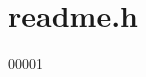 \hypertarget{a00054_source}{\section{readme.\+h}
\label{a00054_source}
}

\begin{DoxyCode}
00001 
\end{DoxyCode}
